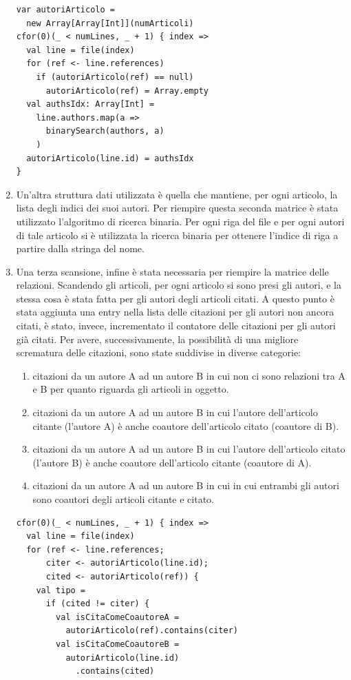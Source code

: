 \documentclass[a4paper, 12pt]{article}
\begin{document}
\begin{enumerate}
\begin{lstlisting}[keepspaces=true]
var autoriArticolo =
  new Array[Array[Int]](numArticoli)
cfor(0)(_ < numLines, _ + 1) { index =>
  val line = file(index)
  for (ref <- line.references)
    if (autoriArticolo(ref) == null)
      autoriArticolo(ref) = Array.empty
  val authsIdx: Array[Int] =
    line.authors.map(a =>
      binarySearch(authors, a)
    )
  autoriArticolo(line.id) = authsIdx
}
  \end{lstlisting}
  \item Un'altra struttura dati utilizzata è quella che mantiene, per ogni articolo, la lista degli indici dei suoi autori. Per riempire questa seconda matrice è stata utilizzato l'algoritmo di ricerca binaria.
  Per ogni riga del file e per ogni autori di tale articolo si è utilizzata la ricerca binaria per ottenere l'indice di riga a partire dalla stringa del nome.
	  \item Una terza scansione, infine è stata necessaria per riempire la matrice delle relazioni. Scandendo gli articoli, per ogni articolo si sono presi gli autori, e la stessa cosa è stata fatta per gli autori degli articoli citati. A questo punto è stata aggiunta una entry nella lista delle citazioni per gli autori non ancora citati, è stato, invece, incrementato il contatore delle citazioni per gli autori già citati. Per avere, successivamente, la possibilità di una migliore scrematura delle citazioni, sono state suddivise in diverse categorie:
  \begin{enumerate}
    \item citazioni da un autore A ad un autore B in cui non ci sono relazioni tra A e B per quanto riguarda gli articoli in oggetto.
    \item citazioni da un autore A ad un autore B in cui l'autore dell'articolo citante (l'autore A) è anche coautore dell'articolo citato (coautore di B).
    \item citazioni da un autore A ad un autore B in cui l'autore dell'articolo citato (l'autore B) è anche coautore dell'articolo citante (coautore di A).
    \item citazioni da un autore A ad un autore B in cui in cui entrambi gli autori sono coautori degli articoli citante e citato. 
  \end{enumerate}
  \begin{lstlisting}[keepspaces=true]
cfor(0)(_ < numLines, _ + 1) { index =>
  val line = file(index)
  for (ref <- line.references; 
      citer <- autoriArticolo(line.id);
      cited <- autoriArticolo(ref)) {
    val tipo =
      if (cited != citer) {
        val isCitaComeCoautoreA = 
          autoriArticolo(ref).contains(citer)
        val isCitaComeCoautoreB = 
          autoriArticolo(line.id)
            .contains(cited)


\end{lstlisting}
\end{enumerate}
\end{document}
